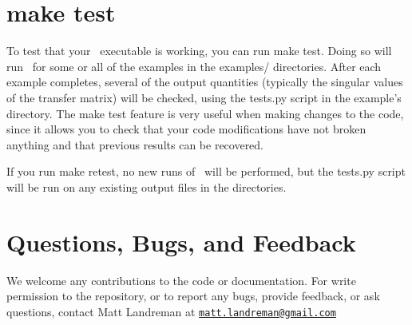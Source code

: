 \section{\ttfamily make test}

To test that your \bdistrib~executable is working, you can run {\ttfamily make test}.  Doing so will run
\bdistrib~for some or all of the examples in the {\ttfamily examples/} directories.
After each example completes, several of the output quantities (typically the singular values
of the transfer matrix)
will be checked, using the
{\ttfamily tests.py} script in the example's directory.
The {\ttfamily make test} feature is very useful when making changes to the code, since it allows you to check
that your code modifications have not broken anything and that previous results
can be recovered.

If you run {\ttfamily make retest},
no new runs of \bdistrib~will be performed, but the {\ttfamily tests.py} script
will be run on any existing output files in the  directories.


\section{Questions, Bugs, and Feedback}

We welcome any contributions to the code or documentation.
For write permission to the repository, or to report any bugs, provide feedback, or ask questions, contact Matt Landreman at
\href{mailto:matt.landreman@gmail.com}{\nolinkurl{matt.landreman@gmail.com} }






